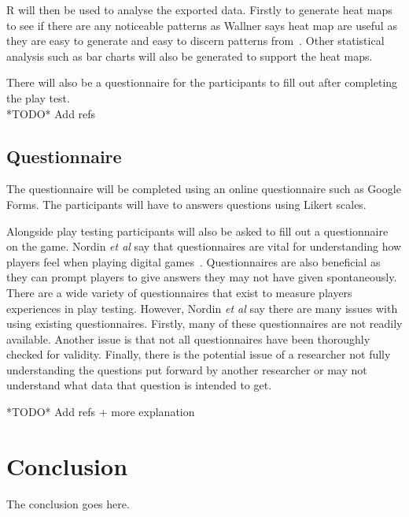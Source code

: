 \documentclass[journal]{IEEEtran}
\begin{document}
R will then be used to analyse the exported data. Firstly to generate heat maps to see if there are any noticeable patterns as Wallner says heat map are useful as they are easy to generate and easy to discern patterns from~\cite{Wallner2015}. 
Other statistical analysis such as  bar charts will also be generated to support the heat maps.
 
There will also be a questionnaire for the participants to fill out after completing the play test.\\

*TODO* Add refs

\subsection{Questionnaire}
The questionnaire will be completed using an online questionnaire such as Google Forms. The participants will have to answers questions using Likert scales.

Alongside play testing participants will also be asked to fill out a questionnaire on the game. Nordin \textit{et al} say that questionnaires are vital for understanding how players feel when playing digital games~\cite{nordin2014}. Questionnaires are also beneficial as they can prompt players to give answers they may not have given spontaneously. There are a wide variety of questionnaires that exist to measure players experiences in play testing. However, Nordin \textit{et al} say there are many issues with using existing questionnaires. Firstly, many of these questionnaires are not readily available. Another issue is that not all questionnaires have been thoroughly checked for validity. Finally, there is the potential issue of a researcher not fully understanding the questions put forward by another researcher or may not understand what data that question is intended to get.
  
  
 
  
*TODO* Add refs + more explanation


\section{Conclusion}
The conclusion goes here.







\end{document}
